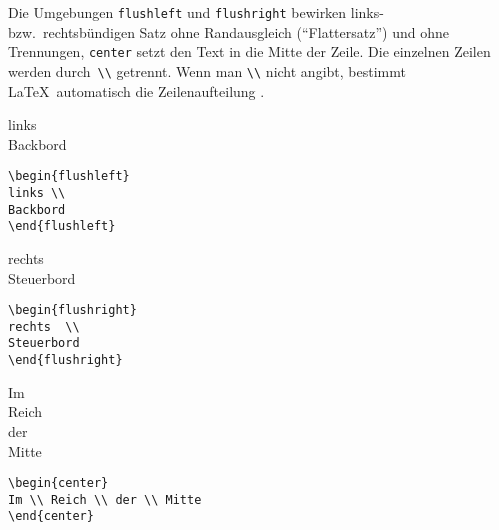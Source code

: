 Die Umgebungen \texttt{flushleft} und \texttt{flushright}
bewirken links- bzw.\ rechtsbündigen Satz ohne Randausgleich 
("`Flattersatz"') und ohne Trennungen, 
\texttt{center} setzt den Text in
die Mitte der Zeile.
Die einzelnen Zeilen werden durch~\verb|\\| getrennt.
Wenn man \verb|\\| nicht angibt, bestimmt \LaTeX\ automatisch die
Zeilenaufteilung%
.
\exa
\begin{flushleft}
links \\
Backbord
\end{flushleft}
\exb
\begin{verbatim}
\begin{flushleft}
links \\
Backbord
\end{flushleft}
\end{verbatim}
\exc
\exa
\begin{flushright}
rechts  \\
Steuerbord
\end{flushright}
\exb
\begin{verbatim}
\begin{flushright}
rechts  \\
Steuerbord
\end{flushright}
\end{verbatim}
\exc
\exa
\begin{center}
Im \\ Reich \\ der \\ Mitte
\end{center}
\exb
\begin{verbatim}
\begin{center}
Im \\ Reich \\ der \\ Mitte
\end{center}
\end{verbatim}
\exc


